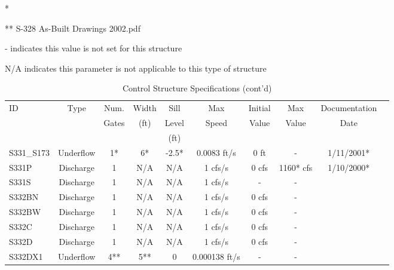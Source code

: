 \begin{table}[h]
* \cite{corp2005}

** S-328 As-Built Drawings 2002.pdf

- indicates this value is not set for this structure

N/A indicates this parameter is not applicable to this type of structure
\end{table}
\normalsize

\scriptsize
\begin{table}[h]
\caption{Control Structure Specifications (cont'd)}
\label{tab:struc-specs3}
\begin{tabular}{@{}lccccccccc@{}}
\toprule
{ID}            & {Type}        & Num.     & Width       & Sill         & Max            & Initial         & Max        & Documentation  \\
                &               & Gates    & (ft)        & Level        & Speed          & Value           & Value      & Date           \\
                &               &          &             & (ft)         &                &                 &            &                \\
\hline
{S331\_S173}    & Underflow     & 1*       & 6*          & -2.5*        & 0.0083 ft/s    & 0 ft            & -          & 1/11/2001*  \\
{S331P}         & Discharge     & 1        & N/A         & N/A          & 1 cfs/s        & 0 cfs           & 1160* cfs  & 1/10/2000*  \\
{S331S}         & Discharge     & 1        & N/A         & N/A          & 1 cfs/s        & -               & -          &             \\
{S332BN}        & Discharge     & 1        & N/A         & N/A          & 1 cfs/s        & 0 cfs           & -          &             \\
{S332BW}        & Discharge     & 1        & N/A         & N/A          & 1 cfs/s        & 0 cfs           & -          &             \\
{S332C}         & Discharge     & 1        & N/A         & N/A          & 1 cfs/s        & 0 cfs           & -          &             \\
{S332D}         & Discharge     & 1        & N/A         & N/A          & 1 cfs/s        & 0 cfs           & -          &             \\
{S332DX1}       & Underflow     & 4**      & 5**         & 0            & 0.000138 ft/s  & -               & -          &             \\

\end{tabular}
\end{table}
